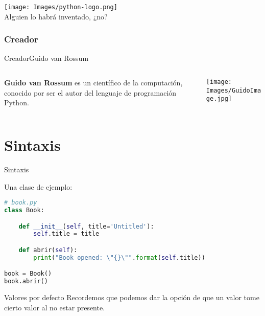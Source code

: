 \documentclass{beamer}
\begin{document}
\begin{frame}
  \begin{center}
    \texttt{[image: Images/python-logo.png]}
    \\
    \pause %
    Alguien lo habrá inventado, ¿no?
  \end{center}
\end{frame}

\subsubsection{Creador}

\begin{frame}{Creador}{Guido van Rossum}
    \begin{columns}[T] %
    \begin{column}[T]{0.6\textwidth} %
    \textbf{Guido van Rossum} es un científico de la computación, conocido por ser el autor del lenguaje de programación Python.
    \end{column}
    \begin{column}[T]{0.4\textwidth} %
         \texttt{[image: Images/GuidoImage.jpg]}
    \end{column}
    \end{columns}
\end{frame}


\section{Sintaxis}

\begin{frame}[fragile]{Sintaxis}

    Una clase de ejemplo:

    \begin{lstlisting}[language=Python,keywordstyle=\bf,stringstyle=\it]
# book.py
class Book:

    def __init__(self, title='Untitled'):
        self.title = title

    def abrir(self):
        print("Book opened: \"{}\"".format(self.title))

book = Book()
book.abrir()

  \end{lstlisting}
  
  \begin{block}{Valores por defecto}
  Recordemos que podemos dar la opción de que un valor tome cierto valor al no estar presente.
  \end{block}
  
\end{frame}
\end{document}
